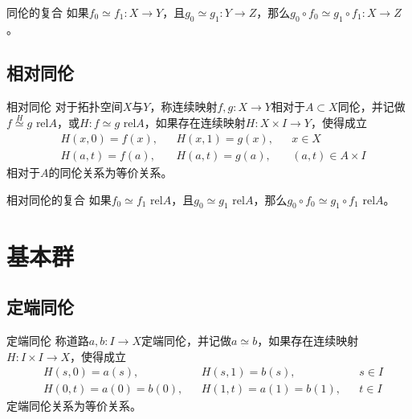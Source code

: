 \documentclass[lang = cn, scheme = chinese, thmcnt = section, usesamecnt]{elegantbook}
\newcommand{\sub}{\subset}             %
\begin{document}
\begin{proposition}{同伦的复合}
	如果$f_0\simeq f_1:X\to Y$，且$g_0\simeq g_1:Y\to Z$，那么$g_0\circ f_0\simeq g_1\circ f_1:X\to Z$。
\end{proposition}

\subsection{相对同伦}

\begin{definition}{相对同伦}
	对于拓扑空间$X$与$Y$，称连续映射$f,g:X\to Y$相对于$A\sub X$同伦，并记做$f\overset{H}{\simeq}g\text{ rel}A$，或$H:f\simeq g\text{ rel}A$，如果存在连续映射$H:X\times I \to Y$，使得成立%
	\begin{align*}
		& H(x,0)=f(x), &&
		H(x,1)=g(x), &&
		x\in X\\
		& H(a,t)=f(a), &&
		H(a,t)=g(a), &&
		(a,t)\in A\times I
	\end{align*}
	相对于$A$的同伦关系为等价关系。
\end{definition}

\begin{proposition}{相对同伦的复合}
	如果$f_0\simeq f_1\text{ rel}A$，且$g_0\simeq g_1\text{ rel}A$，那么$g_0\circ f_0\simeq g_1\circ f_1\text{ rel}A$。
\end{proposition}

\section{基本群}

\subsection{定端同伦}

\begin{definition}{定端同伦}
	称道路$a,b: I \to X$定端同伦，并记做$a\underset{\dot{}}{\simeq}b$，如果存在连续映射$H: I \times I \to X$，使得成立
	\begin{align*}
		&H(s,0)=a(s),&&
		H(s,1)=b(s),&&
		s\in I \\
		&H(0,t)=a(0)=b(0),&&
		H(1,t)=a(1)=b(1),&& 
		t\in I 
	\end{align*}
	定端同伦关系为等价关系。
\end{definition}
\end{document}

